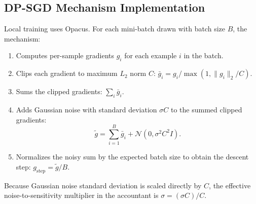 \documentclass[11pt,a4paper]{article}
\begin{document}
\subsection{DP-SGD Mechanism Implementation}
Local training uses Opacus. For each mini-batch drawn with batch size $B$, the mechanism:
\begin{enumerate}
    \item Computes per-sample gradients $g_i$ for each example $i$ in the batch.
    \item Clips each gradient to maximum $L_2$ norm $C$: $\bar{g}_i = g_i / \max(1, \|g_i\|_2 / C)$.
    \item Sums the clipped gradients: $\sum_{i} \bar{g}_i$.
    \item Adds Gaussian noise with standard deviation $\sigma C$ to the summed clipped gradients:
    \begin{equation}
        \tilde{g} = \sum_{i=1}^{B} \bar{g}_i + \mathcal{N}(0, \sigma^2 C^2 I).
    \end{equation}
    \item Normalizes the noisy sum by the expected batch size to obtain the descent step: $g_{\text{step}} = \tilde{g} / B$.
\end{enumerate}
Because Gaussian noise standard deviation is scaled directly by $C$, the effective noise-to-sensitivity multiplier in the accountant is $\sigma = (\sigma C) / C$.
\end{document}

